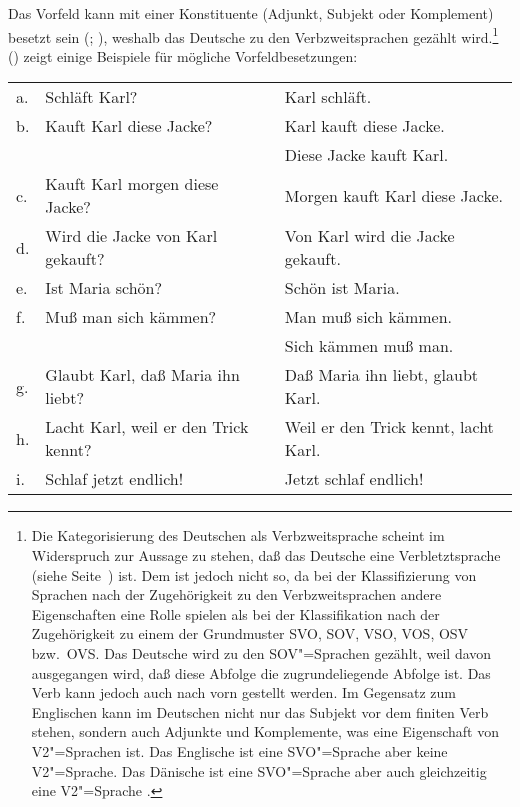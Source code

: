 Das Vorfeld kann mit einer Konstituente (Adjunkt, Subjekt oder Komplement) besetzt sein (\citealp[Kapitel~2.4]{Erdmann1886a};
\citealp[, S.\,77]{Paul1919a}), weshalb das Deutsche zu den Verbzweitsprachen gezählt wird.\footnote{%
  Die Kategorisierung des Deutschen als Verbzweitsprache scheint im Widerspruch zur Aussage zu stehen, 
  daß das Deutsche eine Verbletztsprache (siehe Seite~\pageref{page-verbletzt}) ist. Dem ist
  jedoch nicht so, da bei der Klassifizierung von Sprachen nach der Zugehörigkeit zu den Verbzweitsprachen
  andere Eigenschaften eine Rolle spielen als bei der Klassifikation nach der Zugehörigkeit zu einem
  der Grundmuster SVO, SOV, VSO, VOS, OSV bzw.\ OVS. Das Deutsche wird zu den SOV"=Sprachen gezählt,
  weil davon ausgegangen wird, daß diese Abfolge die zugrundeliegende Abfolge ist. Das Verb kann jedoch auch nach 
  vorn gestellt werden. Im Gegensatz zum Englischen kann im Deutschen nicht nur
  das Subjekt vor dem finiten Verb stehen, sondern auch Adjunkte und Komplemente, was eine Eigenschaft
  von V2"=Sprachen ist. Das Englische ist eine SVO"=Sprache aber keine V2"=Sprache. Das Dänische ist
  eine SVO"=Sprache aber auch gleichzeitig eine V2"=Sprache \citep{Vikner95a-u,MOeDanish}.%
}
() zeigt einige Beispiele für mögliche Vorfeldbesetzungen:
\ea
\label{fragen}
\begin{tabular}[t]{@{}l@{~}ll}
a. & Schläft Karl?                                        & Karl schläft.\\
b. & Kauft Karl diese Jacke?                              & Karl kauft diese Jacke.\\
   &                                                      & Diese Jacke kauft Karl.\\
c. & Kauft Karl morgen diese Jacke?                       & Morgen kauft Karl diese Jacke.\\
d. & Wird die Jacke von Karl gekauft?                     & Von Karl wird die Jacke gekauft.\\
e. & Ist Maria schön?                                     & Schön ist Maria.\\
f. & Muß man sich kämmen?                                 & Man muß sich kämmen.\\
   &                                                      & Sich kämmen muß man.\\
g. & Glaubt Karl, daß Maria ihn liebt?                    & Daß Maria ihn liebt, glaubt Karl.\\
h. & Lacht Karl, weil er den Trick kennt?   & Weil er den Trick kennt, lacht Karl.\\
i. & Schlaf jetzt endlich!                                & Jetzt schlaf endlich!\\
\end{tabular}
\z


